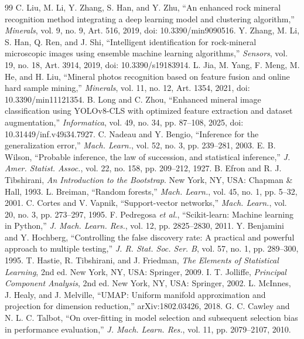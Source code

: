 \documentclass[journal]{IEEEtran}
\begin{document}
\begin{thebibliography}{99}
 C. Liu, M. Li, Y. Zhang, S. Han, and Y. Zhu, ``An enhanced rock mineral recognition method integrating a deep learning model and clustering algorithm,'' \emph{Minerals}, vol. 9, no. 9, Art. 516, 2019, doi: 10.3390/min9090516.
 Y. Zhang, M. Li, S. Han, Q. Ren, and J. Shi, ``Intelligent identification for rock-mineral microscopic images using ensemble machine learning algorithms,'' \emph{Sensors}, vol. 19, no. 18, Art. 3914, 2019, doi: 10.3390/s19183914.
 L. Jia, M. Yang, F. Meng, M. He, and H. Liu, ``Mineral photos recognition based on feature fusion and online hard sample mining,'' \emph{Minerals}, vol. 11, no. 12, Art. 1354, 2021, doi: 10.3390/min11121354.
 B. Long and C. Zhou, ``Enhanced mineral image classification using YOLOv8-CLS with optimized feature extraction and dataset augmentation,'' \emph{Informatica}, vol. 49, no. 34, pp. 87--108, 2025, doi: 10.31449/inf.v49i34.7927.
 C. Nadeau and Y. Bengio, ``Inference for the generalization error,'' \emph{Mach. Learn.}, vol. 52, no. 3, pp. 239--281, 2003.
 E. B. Wilson, ``Probable inference, the law of succession, and statistical inference,'' \emph{J. Amer. Statist. Assoc.}, vol. 22, no. 158, pp. 209--212, 1927.
 B. Efron and R. J. Tibshirani, \emph{An Introduction to the Bootstrap}. New York, NY, USA: Chapman \& Hall, 1993.
 L. Breiman, ``Random forests,'' \emph{Mach. Learn.}, vol. 45, no. 1, pp. 5--32, 2001.
 C. Cortes and V. Vapnik, ``Support-vector networks,'' \emph{Mach. Learn.}, vol. 20, no. 3, pp. 273--297, 1995.
 F. Pedregosa \emph{et al.}, ``Scikit-learn: Machine learning in Python,'' \emph{J. Mach. Learn. Res.}, vol. 12, pp. 2825--2830, 2011.
 Y. Benjamini and Y. Hochberg, ``Controlling the false discovery rate: A practical and powerful approach to multiple testing,'' \emph{J. R. Stat. Soc. Ser. B}, vol. 57, no. 1, pp. 289--300, 1995.
 T. Hastie, R. Tibshirani, and J. Friedman, \emph{The Elements of Statistical Learning}, 2nd ed. New York, NY, USA: Springer, 2009.
 I. T. Jolliffe, \emph{Principal Component Analysis}, 2nd ed. New York, NY, USA: Springer, 2002.
 L. McInnes, J. Healy, and J. Melville, ``UMAP: Uniform manifold approximation and projection for dimension reduction,'' arXiv:1802.03426, 2018.
 G. C. Cawley and N. L. C. Talbot, ``On over-fitting in model selection and subsequent selection bias in performance evaluation,'' \emph{J. Mach. Learn. Res.}, vol. 11, pp. 2079--2107, 2010.
\end{thebibliography}
\end{document}
